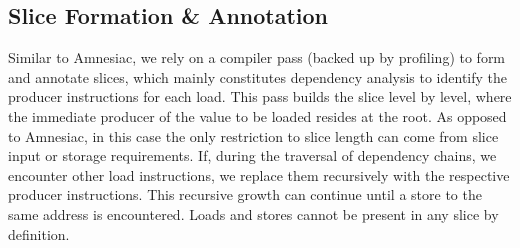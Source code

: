  
\subsection{Slice Formation \& Annotation}
Similar to Amnesiac, we rely on a compiler pass (backed up by profiling) to form and annotate slices, which 
 mainly constitutes
dependency analysis to
identify the producer instructions for each load.
This pass builds the slice level by level, where
the immediate producer of the value to be loaded resides at the root.
As opposed to Amnesiac, in this case the only restriction to slice length can come from slice input or storage requirements. 
If, during the traversal of dependency chains, we encounter other load instructions, we 
replace them recursively with the respective producer instructions. 
This recursive growth can continue until a store to the same address is encountered.
Loads and stores cannot be present 
in any slice by definition.

